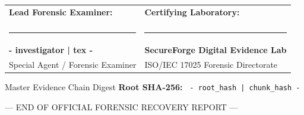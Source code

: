 \documentclass[12pt]{article}
\begin{document}
\vspace{0.8cm}

\begin{table}[H]
\centering
\noindent
\begin{tabularx}{\textwidth}{XX}
\textbf{Lead Forensic Examiner:} & \textbf{Certifying Laboratory:} \tabularnewline
\vspace{0.1cm} & \vspace{0.1cm} \tabularnewline
\rule{7.0cm}{0.8pt} & \rule{7.0cm}{0.8pt} \tabularnewline
\textbf{ {{- investigator | tex -}} } & \textbf{SecureForge Digital Evidence Lab} \tabularnewline
Special Agent / Forensic Examiner & ISO/IEC 17025 Forensic Directorate \tabularnewline
\end{tabularx}
\end{table}

\vspace{0.2cm}
\begin{infocard}{Master Evidence Chain Digest}
\noindent
\textbf{Root SHA-256:} {\small\texttt{ {{- root_hash | chunk_hash -}} }}
\end{infocard}

\vfill
\begin{center}
\small\textcolor{neutralgray}{--- END OF OFFICIAL FORENSIC RECOVERY REPORT ---}
\end{center}
\end{document}
